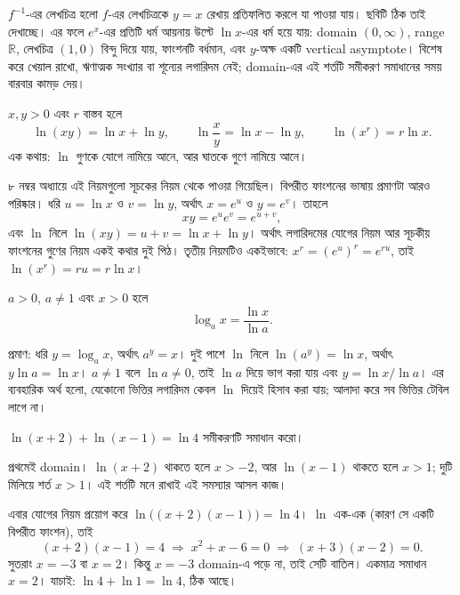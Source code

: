 \documentclass[11pt]{article}
\begin{document}
$f^{-1}$-এর লেখচিত্র হলো $f$-এর লেখচিত্রকে
$y = x$ রেখায় প্রতিফলিত করলে যা পাওয়া যায়। ছবিটি ঠিক তাই দেখাচ্ছে। এর ফলে
$e^{x}$-এর প্রতিটি ধর্ম আয়নায় উল্টে $\ln x$-এর ধর্ম হয়ে যায়: domain $(0,\infty)$,
range $\mathbb{R}$, লেখচিত্র $(1,0)$ বিন্দু দিয়ে যায়, ফাংশনটি বর্ধমান, এবং
$y$-অক্ষ একটি vertical asymptote। বিশেষ করে খেয়াল রাখো, ঋণাত্মক সংখ্যার বা
শূন্যের লগারিদম নেই; domain-এর এই শর্তটি সমীকরণ সমাধানের সময় বারবার কামড় দেয়।

\begin{idea}[লগারিদমের নিয়ম, ফাংশনের ভাষায়]
$x, y > 0$ এবং $r$ বাস্তব হলে
\[
  \ln (xy) = \ln x + \ln y, \qquad
  \ln \frac{x}{y} = \ln x - \ln y, \qquad
  \ln \left( x^{r} \right) = r \ln x .
\]
এক কথায়: $\ln$ গুণকে যোগে নামিয়ে আনে, আর ঘাতকে গুণে নামিয়ে আনে।
\end{idea}

৮ নম্বর অধ্যায়ে এই নিয়মগুলো সূচকের নিয়ম থেকে পাওয়া গিয়েছিল। বিপরীত ফাংশনের
ভাষায় প্রমাণটা আরও পরিষ্কার। ধরি $u = \ln x$ ও $v = \ln y$, অর্থাৎ $x = e^{u}$ ও
$y = e^{v}$। তাহলে
\[
  xy = e^{u} e^{v} = e^{u+v} ,
\]
এবং $\ln$ নিলে $\ln(xy) = u + v = \ln x + \ln y$। অর্থাৎ লগারিদমের যোগের নিয়ম
আর সূচকীয় ফাংশনের গুণের নিয়ম একই কথার দুই পিঠ। তৃতীয় নিয়মটিও একইভাবে:
$x^{r} = \left( e^{u} \right)^{r} = e^{ru}$, তাই $\ln(x^{r}) = ru = r \ln x$।

\begin{idea}[ভিত্তি পরিবর্তন]
$a > 0$, $a \neq 1$ এবং $x > 0$ হলে
\[
  \log_{a} x = \frac{\ln x}{\ln a} .
\]
\end{idea}

প্রমাণ: ধরি $y = \log_{a} x$, অর্থাৎ $a^{y} = x$। দুই পাশে $\ln$ নিলে
$\ln(a^{y}) = \ln x$, অর্থাৎ $y \ln a = \ln x$। $a \neq 1$ বলে $\ln a \neq 0$,
তাই $\ln a$ দিয়ে ভাগ করা যায় এবং $y = \ln x / \ln a$। এর ব্যবহারিক অর্থ হলো,
যেকোনো ভিত্তির লগারিদম কেবল $\ln$ দিয়েই হিসাব করা যায়; আলাদা করে সব ভিত্তির
টেবিল লাগে না।

\begin{example}
$\ln(x+2) + \ln(x-1) = \ln 4$ সমীকরণটি সমাধান করো।
\end{example}

\begin{solbox}
প্রথমেই domain। $\ln(x+2)$ থাকতে হলে $x > -2$, আর $\ln(x-1)$ থাকতে হলে $x > 1$;
দুটি মিলিয়ে শর্ত $x > 1$। এই শর্তটি মনে রাখাই এই সমস্যার আসল কাজ।

এবার যোগের নিয়ম প্রয়োগ করে $\ln \bigl( (x+2)(x-1) \bigr) = \ln 4$। $\ln$ এক-এক
(কারণ সে একটি বিপরীত ফাংশন), তাই
\[
  (x+2)(x-1) = 4 \;\Longrightarrow\; x^{2} + x - 6 = 0
  \;\Longrightarrow\; (x+3)(x-2) = 0 .
\]
সুতরাং $x = -3$ বা $x = 2$। কিন্তু $x = -3$ domain-এ পড়ে না, তাই সেটি বাতিল।
একমাত্র সমাধান $x = 2$। যাচাই: $\ln 4 + \ln 1 = \ln 4$, ঠিক আছে।
\end{solbox}
\end{document}
